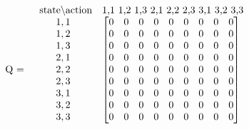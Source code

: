 \documentclass{standalone}
\begin{document}
$
\begin{array}{ccl}
& \text{\hspace{2px} state\textbackslash action} 
& \text{1,1 1,2 1,3 2,1 2,2 2,3 3,1 3,2 3,3} \\
\text{Q =} &
\begin{array}{c}
    1,1 \\
    1,2 \\
    1,3 \\
    2,1 \\
    2,2 \\
    2,3 \\
    3,1 \\
    3,2 \\
    3,3
\end{array} &
\begin{bmatrix}
    0 & 0 & 0 & 0 & 0 & 0 & 0 & 0 & 0 \\
    0 & 0 & 0 & 0 & 0 & 0 & 0 & 0 & 0 \\
    0 & 0 & 0 & 0 & 0 & 0 & 0 & 0 & 0 \\
    0 & 0 & 0 & 0 & 0 & 0 & 0 & 0 & 0 \\
    0 & 0 & 0 & 0 & 0 & 0 & 0 & 0 & 0 \\
    0 & 0 & 0 & 0 & 0 & 0 & 0 & 0 & 0 \\
    0 & 0 & 0 & 0 & 0 & 0 & 0 & 0 & 0 \\
    0 & 0 & 0 & 0 & 0 & 0 & 0 & 0 & 0 \\
    0 & 0 & 0 & 0 & 0 & 0 & 0 & 0 & 0 \\
\end{bmatrix}
\end{array}
$
\end{document}

